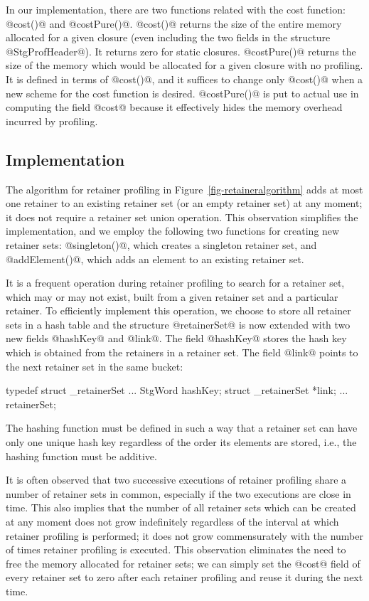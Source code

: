 \documentclass{article}
\begin{document}
In our implementation, there are two functions related with the cost function:
@cost()@ and @costPure()@. 
@cost()@ returns the size of the entire memory allocated for a given closure
(even including the two fields in the structure @StgProfHeader@). 
It returns zero for static closures. 
@costPure()@ returns the size of the memory which would be allocated for
a given closure with no profiling.
It is defined in terms of @cost()@, and it suffices to change only @cost()@
when a new scheme for the cost function is desired.
@costPure()@ is put to actual use in computing the field @cost@ because it 
effectively hides the memory overhead incurred by profiling.

\subsection{Implementation}

The algorithm for retainer profiling in Figure~\ref{fig-retaineralgorithm} 
adds at most one retainer to an existing retainer set (or an empty retainer set)
at any moment; it does not require a retainer set union operation.
This observation simplifies the implementation, and
we employ the following two functions for creating new retainer sets: 
@singleton()@, which creates a singleton retainer set, and 
@addElement()@, which adds an element to an existing retainer set. 

It is a frequent operation during retainer profiling to search for a retainer
set, which may or may not exist, built from a given retainer set and a
particular retainer.
To efficiently implement this operation,
we choose to store all retainer sets in a hash table and 
the structure @retainerSet@ is now extended with two new fields
@hashKey@ and @link@.
The field @hashKey@ stores the hash key which is obtained
from the retainers in a retainer set.
The field @link@ points to the next retainer set in the same bucket:

\begin{code}
typedef struct _retainerSet {
  ...
  StgWord hashKey;
  struct _retainerSet *link;
  ...
} retainerSet;
\end{code}

The hashing function must be defined in such a way that a retainer set
can have only one unique hash key regardless of the order its elements
are stored, i.e., the hashing function must be additive.

It is often observed that two successive executions of retainer profiling share
a number of retainer sets in common, especially if the two executions are
close in time.
This also implies that the number of all retainer sets which can be created
at any moment does not grow indefinitely regardless of the interval at which
retainer profiling is performed; it does not grow commensurately with the
number of times retainer profiling is executed.
This observation eliminates the need to free the memory allocated for
retainer sets; we can simply set the @cost@ field of every retainer set
to zero after each retainer profiling and reuse it during the next time.
\end{document}
